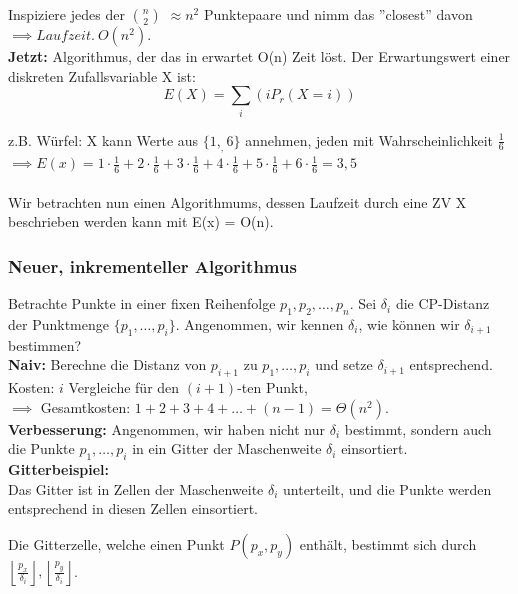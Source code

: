 \documentclass{article}
\begin{document}
Inspiziere jedes der $\binom{n}{2}$  $ \approx n^2$ Punktepaare und nimm das ''closest'' davon  $\implies Laufzeit.\ O(n^2)$.\\
\textbf{Jetzt:} Algorithmus, der das in erwartet O(n) Zeit löst.
Der Erwartungswert einer diskreten Zufallsvariable X ist: \\

\[ E(X) = \sum_{i}(i P_r(X=i)) \] 

z.B. Würfel: X kann Werte aus $\{1,_,6\}$ annehmen, jeden mit Wahrscheinlichkeit $\frac{1}{6}$ \\

$\implies E(x) = 1 \cdot \frac{1}{6} + 2 \cdot \frac{1}{6} + 3 \cdot \frac{1}{6} + 4 \cdot \frac{1}{6} + 5 \cdot \frac{1}{6} + 6 \cdot \frac{1}{6} = 3,5$ \\
\\
Wir betrachten nun einen Algorithmums, dessen Laufzeit durch eine ZV X beschrieben werden kann mit E(x) = O(n).\\
\subsubsection{Neuer, inkrementeller Algorithmus}

Betrachte Punkte in einer fixen Reihenfolge \( p_1, p_2, \dots, p_n \).  
Sei \( \delta_i \) die CP-Distanz der Punktmenge \( \{p_1, \dots, p_i\} \).  
Angenommen, wir kennen \( \delta_i \), wie können wir \( \delta_{i+1} \) bestimmen?\\

\textbf{Naiv:} Berechne die Distanz von \( p_{i+1} \) zu \( p_1, \dots, p_i \) und setze \( \delta_{i+1} \) entsprechend.\\
Kosten: \( i \) Vergleiche für den \( (i+1) \)-ten Punkt,\\
\( \implies \) Gesamtkosten: \( 1 + 2 + 3 + 4 + \dots + (n-1) = \varTheta(n^2) \).\\

\textbf{Verbesserung:} Angenommen, wir haben nicht nur \( \delta_i \) bestimmt, sondern auch die Punkte \( p_1, \dots, p_i \) in ein Gitter der Maschenweite \( \delta_i \) einsortiert.\\

\textbf{Gitterbeispiel:}\\
Das Gitter ist in Zellen der Maschenweite \( \delta_i \) unterteilt, und die Punkte werden entsprechend in diesen Zellen einsortiert.

    Die Gitterzelle, welche einen Punkt \( P(p_x, p_y) \) enthält, bestimmt sich durch \( \left\lfloor \frac{p_x}{\delta_i} \right\rfloor, \left\lfloor \frac{p_y}{\delta_i} \right\rfloor \).\\
\end{document}
